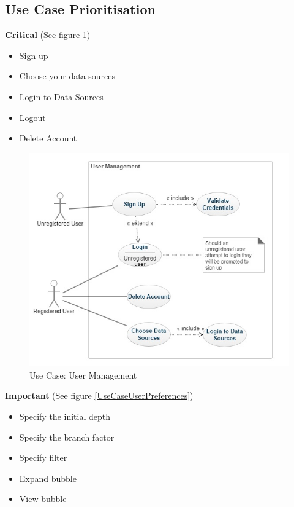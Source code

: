 \documentclass[hidelinks,english]{article}
\begin{document}
		\subsection{Use Case Prioritisation}
			\textbf{Critical} (See figure \ref{UseCaseUserManagement})
			\begin{itemize}
			    \item Sign up
			    \item Choose your data sources
			    \item Login to Data Sources
			    \item Logout
			    \item Delete Account
			\end{itemize}
			\begin{figure}[!h]
				\includegraphics[width=\linewidth]{UserManagement.jpg}
				\caption{Use Case: User Management}
				\label{UseCaseUserManagement}
			\end{figure}
			\textbf{Important} (See figure \ref{UseCaseUserPreferences})
			\begin{itemize}
			    \item Specify the initial depth
			    \item Specify the branch factor
			    \item Specify filter
			    \item Expand bubble
			   	\item View bubble
			\end{itemize}
\end{document}
